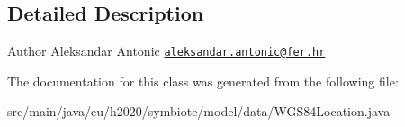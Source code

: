 \subsection{Detailed Description}
\begin{DoxyAuthor}{Author}
Aleksandar Antonic \href{mailto:aleksandar.antonic@fer.hr}{\tt aleksandar.\+antonic@fer.\+hr} 
\end{DoxyAuthor}


The documentation for this class was generated from the following file\+:\begin{DoxyCompactItemize}
\item 
src/main/java/eu/h2020/symbiote/model/data/W\+G\+S84\+Location.\+java\end{DoxyCompactItemize}
